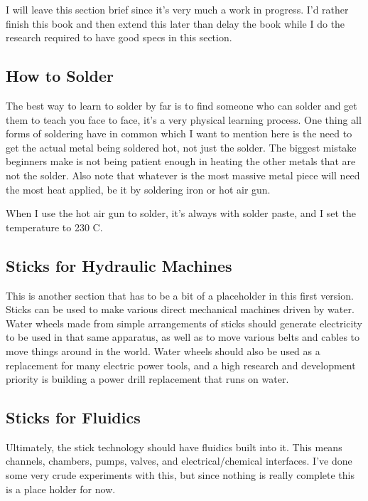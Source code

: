 I will leave this section brief since it's very much a work in progress.
I'd rather finish this book and then extend this later than delay the
book while I do the research required to have good specs in this
section.

\subsection{How to Solder}\label{how-to-solder}

The best way to learn to solder by far is to find someone who can solder
and get them to teach you face to face, it's a very physical learning
process. One thing all forms of soldering have in common which I want to
mention here is the need to get the actual metal being soldered hot, not
just the solder. The biggest mistake beginners make is not being patient
enough in heating the other metals that are not the solder. Also note
that whatever is the most massive metal piece will need the most heat
applied, be it by soldering iron or hot air gun.

When I use the hot air gun to solder, it's always with solder paste, and
I set the temperature to 230 C.

\subsection{Sticks for Hydraulic
Machines}\label{sticks-for-hydraulic-machines}

This is another section that has to be a bit of a placeholder in this
first version. Sticks can be used to make various direct mechanical
machines driven by water. Water wheels made from simple arrangements of
sticks should generate electricity to be used in that same apparatus, as
well as to move various belts and cables to move things around in the
world. Water wheels should also be used as a replacement for many
electric power tools, and a high research and development priority is
building a power drill replacement that runs on water.

\subsection{Sticks for Fluidics}\label{sticks-for-fluidics}

Ultimately, the stick technology should have fluidics built into it.
This means channels, chambers, pumps, valves, and electrical/chemical
interfaces. I've done some very crude experiments with this, but since
nothing is really complete this is a place holder for now.

